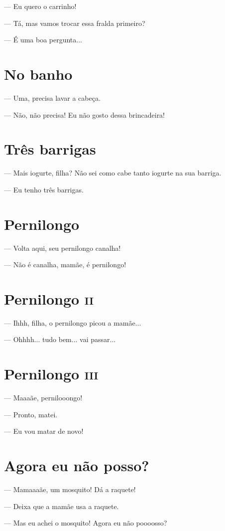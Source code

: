 {— Eu quero o carrinho!

— Tá, mas vamos trocar essa fralda primeiro?

— É uma boa pergunta...

\chapter{No banho}

— Uma, precisa lavar a cabeça.

— Não, não precisa! Eu não gosto dessa brincadeira!

\chapter{Três barrigas}

— Mais iogurte, filha? Não sei como cabe tanto iogurte na sua barriga.

— Eu tenho três barrigas.

\chapter{Pernilongo}

— Volta aqui, seu pernilongo canalha!

— Não é canalha, mamãe, é pernilongo!

\chapter{Pernilongo \textsc{ii}}

— Ihhh, filha, o pernilongo picou a mamãe...

— Ohhhh... tudo bem... vai passar...

\chapter{Pernilongo \textsc{iii}}

— Maaaãe, pernilooongo!

— Pronto, matei.

— Eu vou matar de novo!

\chapter{Agora eu não posso?}

— Mamaaaãe, um mosquito! Dá a raquete!

— Deixa que a mamãe usa a raquete.

— Mas eu achei o mosquito! Agora eu não poooosso?

}
